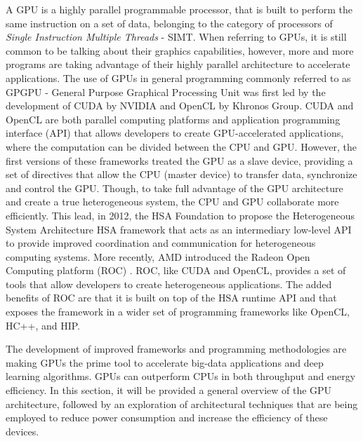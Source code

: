 A GPU is a highly parallel programmable processor, that is built to perform the same instruction on a set of data, belonging to the category of processors of \textit{Single Instruction Multiple Threads} - SIMT. When referring to GPUs, it is still common to be talking about their graphics capabilities, however, more and more programs are taking advantage of their highly parallel architecture to accelerate applications. The use of GPUs in general programming commonly referred to as GPGPU - General Purpose Graphical Processing Unit was first led by the development of CUDA by NVIDIA and OpenCL by Khronos Group. CUDA and OpenCL are both parallel computing platforms and application programming interface (API) that allows developers to create GPU-accelerated applications, where the computation can be divided between the CPU and GPU. However, the first versions of these frameworks treated the GPU as a slave device, providing a set of directives that allow the CPU (master device) to transfer data, synchronize and control the GPU.  Though, to take full advantage of the GPU architecture and create a true heterogeneous system, the CPU and GPU collaborate more efficiently. This lead, in 2012, the HSA Foundation to propose the Heterogeneous System Architecture HSA \cite{hwu_heterogeneous_2015} framework that acts as an intermediary low-level API to provide improved coordination and communication for heterogeneous computing systems.  More recently, AMD introduced the Radeon Open Computing platform (ROC) \cite{noauthor_radeonopencompute/rocm_2019}. ROC, like CUDA and OpenCL, provides a set of tools that allow developers to create heterogeneous applications. The added benefits of ROC are that it is built on top of the HSA runtime API and that exposes the framework in a wider set of programming frameworks like OpenCL, HC++, and HIP.

The development of improved frameworks and programming methodologies are making GPUs the prime tool to accelerate big-data applications and deep learning algorithms. GPUs can outperform CPUs in both throughput and energy efficiency. In this section, it will be provided a general overview of the GPU architecture, followed by an exploration of architectural techniques that are being employed to reduce power consumption and increase the efficiency of these devices.



